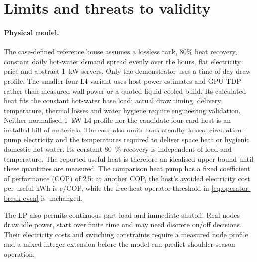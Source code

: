 \section{Limits and threats to validity}
\label{sec:limits}

\paragraph{Physical model.} The case-defined reference house assumes a lossless tank, 80\% heat
recovery, constant daily hot-water demand spread evenly over the hours, flat electricity price and
abstract \qty{1}{kW} servers. Only the demonstrator uses a time-of-day draw profile. The smaller four-L4 variant uses host-power estimates and GPU TDP rather than measured
wall power or a quoted liquid-cooled build. Its calculated heat fits the constant hot-water
base load; actual draw timing, delivery temperature, thermal losses and water hygiene require
engineering validation. Neither normalised 1~kW L4 profile nor the candidate four-card host is
an installed bill of materials.
The case also omits tank standby losses, circulation-pump electricity and the temperatures
required to deliver space heat or hygienic domestic hot water. Its constant \qty{80}{\percent}
recovery is independent of load and temperature. The reported useful heat is therefore an
idealised upper bound until these quantities are measured. The comparison heat pump has a
fixed coefficient of performance (COP) of 2.5: at another COP, the host's avoided electricity
cost per useful kWh is $e/\mathrm{COP}$, while the free-heat operator threshold in
\eqref{eq:operator-break-even} is unchanged.

The LP also permits continuous part load and immediate shutoff. Real nodes draw idle power,
start over finite time and may need discrete on/off decisions. Their electricity costs and
switching constraints require a measured node profile and a mixed-integer extension before
the model can predict shoulder-season operation.

